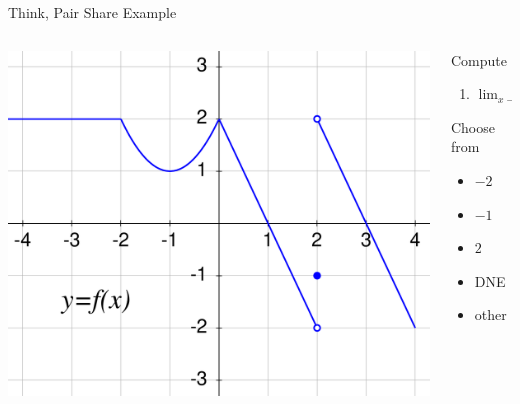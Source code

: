 \documentclass[10pt, aspectratio=169, t]{beamer}
\begin{document}
\begin{frame}{Think, Pair Share Example}
	\begin{columns}
	\begin{column}{0.7\textwidth}

		\includegraphics[width=.9\textwidth]{think-pair-share-graph.pdf}

	\end{column}
	\begin{column}{0.3\textwidth}  %
		\begin{block}{Compute}
			\begin{enumerate}
				\item {\Large $\displaystyle \lim_{x\to 0} f(f(x))$}
			\end{enumerate}
		\end{block}
		\pause
		\begin{block}{Choose from}
			\begin{itemize}
				\item[] $-2$
				\item[] $-1$
				\item[] $2$
				\item[] DNE
				\item[] other
			\end{itemize}
		\end{block}
	\end{column}
	\end{columns}
\end{frame}
\end{document}
